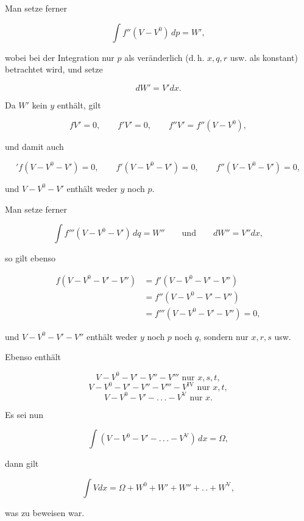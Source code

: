 Man setze ferner

\[
\int f''(V - V^0)\,dp = W',
\]

\noindent wobei bei der Integration nur $p$ als veränderlich (d.\,h. $x, q, r$ usw. als konstant) betrachtet wird, und setze

\[
dW' = V'dx.
\]

\noindent Da $W'$ kein $y$ enthält, gilt

\[
fV' = 0, \qquad f'V' = 0, \qquad f''V' = f''(V - V^0),
\]

\noindent und damit auch

\[
{}'f(V - V^0 - V') = 0, \qquad f'(V - V^0 - V') = 0, \qquad f''(V - V^0 - V') = 0,
\]

\noindent und $V - V^0 - V'$ enthält weder $y$ noch $p$.

Man setze ferner

\[
\int f'''(V - V^0 - V')\,dq = W'' \qquad \text{und} \qquad dW'' = V''dx,
\]

\noindent so gilt ebenso

\[
\begin{aligned}f(V - V^0 - V' - V'') &={} f'(V - V^0 - V' - V'')\\ &={} f''(V - V^0 - V' - V'')\\ &={} f'''(V - V^0 - V' - V'') = 0,\end{aligned}
\]

\noindent und $V - V^0 - V' - V''$ enthält weder $y$ noch $p$ noch $q$, sondern nur $x, r, s$ usw.

Ebenso enthält

\[
V - V^0 - V' - V'' - V''' \text{ nur } x, s, t,
\]
\[
V - V^0 - V' - V'' - V''' - V^{\mathrm{IV}} \text{ nur } x, t,
\]
\[
V - V^0 - V' - .\,.\,. - V^{\mathrm{V}} \text{ nur } x.
\]

\noindent Es sei nun

\[
\int (V - V^0 - V' - .\,.\,. - V^{\mathrm{V}})\,dx = \Omega,
\]

\noindent dann gilt

\[
\int V dx = \Omega + W^0 + W' + W'' + .\,. + W^{\mathrm{V}},
\]

\noindent was zu beweisen war.

